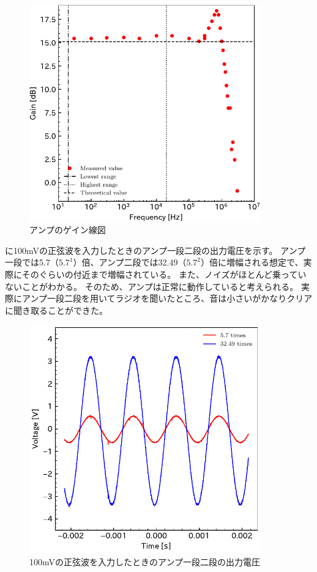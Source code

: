 \documentclass[report.tex]{subfiles}
\begin{document}
\begin{figure}[H]
	\centering
	\includegraphics[width=10cm]{fig/gain.pdf}
	\caption{アンプのゲイン線図}
	\label{fig:gain}
\end{figure}

に100mVの正弦波を入力したときのアンプ一段二段の出力電圧を示す。
アンプ一段では5.7（\(5.7^1\)）倍、アンプ二段では32.49（\(5.7^2\)）倍に増幅される想定で、実際にそのぐらいの付近まで増幅されている。
また、ノイズがほとんど乗っていないことがわかる。
そのため、アンプは正常に動作していると考えられる。
実際にアンプ一段二段を用いてラジオを聞いたところ、音は小さいがかなりクリアに聞き取ることができた。

\begin{figure}[H]
	\centering
	\includegraphics[width=10cm]{fig/level12_100m.pdf}
	\caption{100mVの正弦波を入力したときのアンプ一段二段の出力電圧}
	\label{fig:12_100m}
\end{figure}
\end{document}
